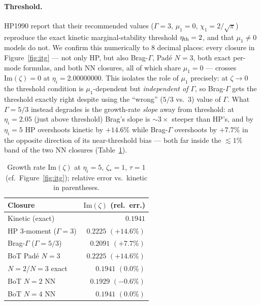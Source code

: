 \documentclass[11pt]{article}
\begin{document}
\paragraph{Threshold.} HP1990 report that their recommended values
($\Gamma=3$, $\mu_1=0$, $\chi_1=2/\sqrt{\pi}$) reproduce the exact
kinetic marginal-stability threshold $\eta_{\rm th}=2$, and that
$\mu_1\neq0$ models do not. We confirm this numerically to 8 decimal
places: every closure in Figure~\ref{fig:itg} --- not only HP, but also
Brag-$\Gamma$, Pad\'e $N{=}3$, both exact per-mode formulas, and both
NN closures, all of which share $\mu_1=0$ --- crosses
$\mathrm{Im}(\zeta)=0$ at $\eta_i=2.00000000$. This isolates the role
of $\mu_1$ precisely: at $\zeta\to0$ the threshold condition is
$\mu_1$-dependent but \emph{independent of $\Gamma$}, so Brag-$\Gamma$
gets the threshold exactly right despite using the ``wrong''
($5/3$ vs.\ $3$) value of $\Gamma$. What $\Gamma=5/3$ instead degrades
is the growth-rate \emph{slope} away from threshold: at $\eta_i=2.05$
(just above threshold) Brag's slope is $\sim\!3\times$ steeper than
HP's, and by $\eta_i=5$ HP overshoots kinetic by $+14.6\%$ while
Brag-$\Gamma$ overshoots by $+7.7\%$ in the opposite direction of its
near-threshold bias --- both far inside the $\lesssim\!1\%$ band of the
two NN closures (Table~\ref{tab:itg}).

\begin{table}[H]
\centering
\caption{Growth rate $\mathrm{Im}(\zeta)$ at $\eta_i=5$, $\zeta_*=1$,
$\tau=1$ (cf.\ Figure~\ref{fig:itg}); relative error vs.\ kinetic in
parentheses.}
\label{tab:itg}
\begin{tabular}{lr}
\toprule
Closure & $\mathrm{Im}(\zeta)$ (rel.\ err.) \\
\midrule
Kinetic (exact)         & $0.1941$ \\
HP 3-moment ($\Gamma=3$) & $0.2225$ $(+14.6\%)$ \\
Brag-$\Gamma$ ($\Gamma=5/3$) & $0.2091$ $(+7.7\%)$ \\
BoT Pad\'e $N{=}3$      & $0.2225$ $(+14.6\%)$ \\
$N{=}2$/$N{=}3$ exact    & $0.1941$ $(0.0\%)$ \\
BoT $N{=}2$ NN          & $0.1929$ $(-0.6\%)$ \\
BoT $N{=}4$ NN          & $0.1941$ $(0.0\%)$ \\
\bottomrule
\end{tabular}
\end{table}
\end{document}

